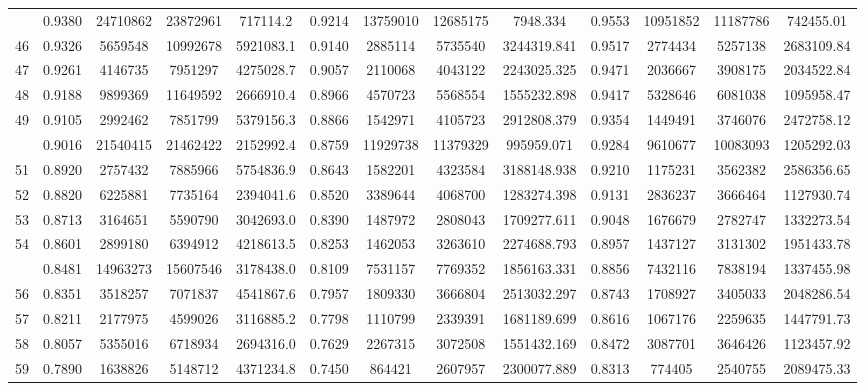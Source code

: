 \documentclass[
  12pt,
]{article}
\begin{document}
\begin{longtable}[t]{lcccccccccccc}
\addlinespace
45 & 0.9380 & 24710862 & 23872961 & 717114.2 & 0.9214 & 13759010 & 12685175 & 7948.334 & 0.9553 & 10951852 & 11187786 & 742455.01\\
46 & 0.9326 & 5659548 & 10992678 & 5921083.1 & 0.9140 & 2885114 & 5735540 & 3244319.841 & 0.9517 & 2774434 & 5257138 & 2683109.84\\
47 & 0.9261 & 4146735 & 7951297 & 4275028.7 & 0.9057 & 2110068 & 4043122 & 2243025.325 & 0.9471 & 2036667 & 3908175 & 2034522.84\\
48 & 0.9188 & 9899369 & 11649592 & 2666910.4 & 0.8966 & 4570723 & 5568554 & 1555232.898 & 0.9417 & 5328646 & 6081038 & 1095958.47\\
49 & 0.9105 & 2992462 & 7851799 & 5379156.3 & 0.8866 & 1542971 & 4105723 & 2912808.379 & 0.9354 & 1449491 & 3746076 & 2472758.12\\
\addlinespace
50 & 0.9016 & 21540415 & 21462422 & 2152992.4 & 0.8759 & 11929738 & 11379329 & 995959.071 & 0.9284 & 9610677 & 10083093 & 1205292.03\\
51 & 0.8920 & 2757432 & 7885966 & 5754836.9 & 0.8643 & 1582201 & 4323584 & 3188148.938 & 0.9210 & 1175231 & 3562382 & 2586356.65\\
52 & 0.8820 & 6225881 & 7735164 & 2394041.6 & 0.8520 & 3389644 & 4068700 & 1283274.398 & 0.9131 & 2836237 & 3666464 & 1127930.74\\
53 & 0.8713 & 3164651 & 5590790 & 3042693.0 & 0.8390 & 1487972 & 2808043 & 1709277.611 & 0.9048 & 1676679 & 2782747 & 1332273.54\\
54 & 0.8601 & 2899180 & 6394912 & 4218613.5 & 0.8253 & 1462053 & 3263610 & 2274688.793 & 0.8957 & 1437127 & 3131302 & 1951433.78\\
\addlinespace
55 & 0.8481 & 14963273 & 15607546 & 3178438.0 & 0.8109 & 7531157 & 7769352 & 1856163.331 & 0.8856 & 7432116 & 7838194 & 1337455.98\\
56 & 0.8351 & 3518257 & 7071837 & 4541867.6 & 0.7957 & 1809330 & 3666804 & 2513032.297 & 0.8743 & 1708927 & 3405033 & 2048286.54\\
57 & 0.8211 & 2177975 & 4599026 & 3116885.2 & 0.7798 & 1110799 & 2339391 & 1681189.699 & 0.8616 & 1067176 & 2259635 & 1447791.73\\
58 & 0.8057 & 5355016 & 6718934 & 2694316.0 & 0.7629 & 2267315 & 3072508 & 1551432.169 & 0.8472 & 3087701 & 3646426 & 1123457.92\\
59 & 0.7890 & 1638826 & 5148712 & 4371234.8 & 0.7450 & 864421 & 2607957 & 2300077.889 & 0.8313 & 774405 & 2540755 & 2089475.33\\

\end{longtable}
\end{document}
